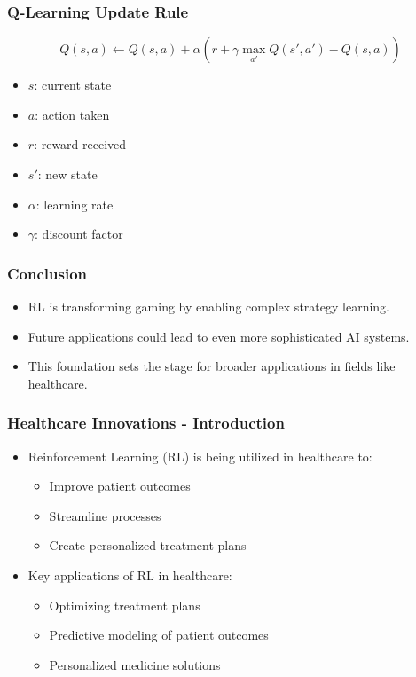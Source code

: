 \documentclass[aspectratio=169]{beamer}
\begin{document}
\begin{frame}[fragile]
    \frametitle{Q-Learning Update Rule}
    \begin{equation}
        Q(s, a) \leftarrow Q(s, a) + \alpha \left( r + \gamma \max_{a'} Q(s', a') - Q(s, a) \right)
    \end{equation}
    \begin{itemize}
        \item \( s \): current state
        \item \( a \): action taken
        \item \( r \): reward received
        \item \( s' \): new state
        \item \( \alpha \): learning rate
        \item \( \gamma \): discount factor
    \end{itemize}
\end{frame}

\begin{frame}[fragile]
    \frametitle{Conclusion}
    \begin{itemize}
        \item RL is transforming gaming by enabling complex strategy learning.
        \item Future applications could lead to even more sophisticated AI systems.
        \item This foundation sets the stage for broader applications in fields like healthcare.
    \end{itemize}
\end{frame}

\begin{frame}[fragile]
    \frametitle{Healthcare Innovations - Introduction}
    \begin{itemize}
        \item Reinforcement Learning (RL) is being utilized in healthcare to:
        \begin{itemize}
            \item Improve patient outcomes
            \item Streamline processes
            \item Create personalized treatment plans
        \end{itemize}
        \item Key applications of RL in healthcare:
        \begin{itemize}
            \item Optimizing treatment plans
            \item Predictive modeling of patient outcomes
            \item Personalized medicine solutions
        \end{itemize}
    \end{itemize}
\end{frame}
\end{document}
